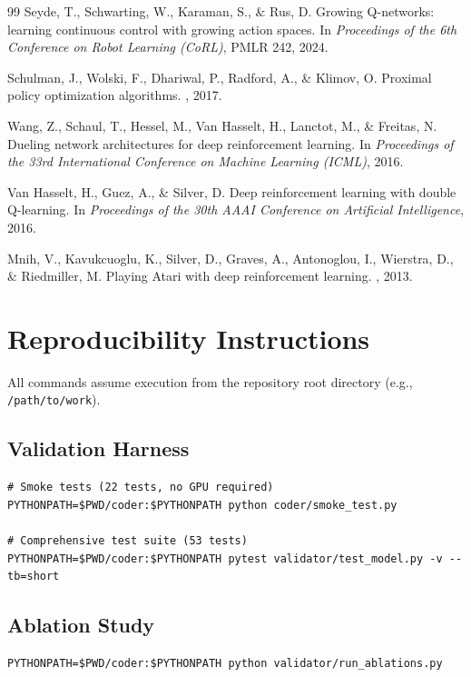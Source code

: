 \documentclass{article}
\begin{document}
{\begin{thebibliography}{99}
Seyde, T., Schwarting, W., Karaman, S., \& Rus, D.
\newblock Growing Q-networks: learning continuous control with growing action
spaces.
\newblock In {\it Proceedings of the 6th Conference on Robot Learning (CoRL)},
  PMLR 242, 2024.

Schulman, J., Wolski, F., Dhariwal, P., Radford, A., \& Klimov, O.
\newblock Proximal policy optimization algorithms.
, 2017.

Wang, Z., Schaul, T., Hessel, M., Van Hasselt, H., Lanctot, M., \&
  Freitas, N.
\newblock Dueling network architectures for deep reinforcement learning.
\newblock In {\it Proceedings of the 33rd International Conference on Machine
  Learning (ICML)}, 2016.

Van Hasselt, H., Guez, A., \& Silver, D.
\newblock Deep reinforcement learning with double Q-learning.
\newblock In {\it Proceedings of the 30th AAAI Conference on Artificial
  Intelligence}, 2016.

Mnih, V., Kavukcuoglu, K., Silver, D., Graves, A., Antonoglou, I.,
  Wierstra, D., \& Riedmiller, M.
\newblock Playing Atari with deep reinforcement learning.
, 2013.

\end{thebibliography}
}


\appendix
\section{Reproducibility Instructions}

All commands assume execution from the repository root directory
(e.g., \texttt{/path/to/work}).

\subsection{Validation Harness}
\begin{verbatim}
# Smoke tests (22 tests, no GPU required)
PYTHONPATH=$PWD/coder:$PYTHONPATH python coder/smoke_test.py

# Comprehensive test suite (53 tests)
PYTHONPATH=$PWD/coder:$PYTHONPATH pytest validator/test_model.py -v --tb=short
\end{verbatim}

\subsection{Ablation Study}
\begin{verbatim}
PYTHONPATH=$PWD/coder:$PYTHONPATH python validator/run_ablations.py
\end{verbatim}
\end{document}
